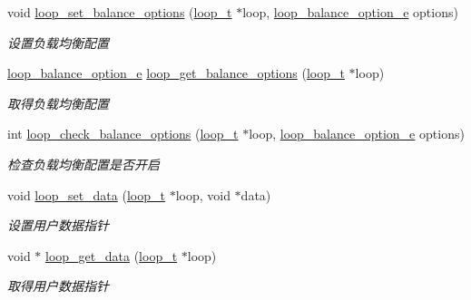 \begin{DoxyCompactItemize}
void \hyperlink{a00062_a20964027b5a498c7f206d6a04568fa11_a20964027b5a498c7f206d6a04568fa11}{loop\+\_\+set\+\_\+balance\+\_\+options} (\hyperlink{a00047_a9c3ad1cd2de83e09f3a7b59fa82c94ee_a9c3ad1cd2de83e09f3a7b59fa82c94ee}{loop\+\_\+t} $\ast$loop, \hyperlink{a00047_a6c87150c8f33855c3427c783480fd8ba_a6c87150c8f33855c3427c783480fd8ba}{loop\+\_\+balance\+\_\+option\+\_\+e} options)
\begin{DoxyCompactList}\small\item\em 设置负载均衡配置 \end{DoxyCompactList}\item 
\hyperlink{a00047_a6c87150c8f33855c3427c783480fd8ba_a6c87150c8f33855c3427c783480fd8ba}{loop\+\_\+balance\+\_\+option\+\_\+e} \hyperlink{a00062_a5098c33527e18f4a0bd9bc1856ce17f1_a5098c33527e18f4a0bd9bc1856ce17f1}{loop\+\_\+get\+\_\+balance\+\_\+options} (\hyperlink{a00047_a9c3ad1cd2de83e09f3a7b59fa82c94ee_a9c3ad1cd2de83e09f3a7b59fa82c94ee}{loop\+\_\+t} $\ast$loop)
\begin{DoxyCompactList}\small\item\em 取得负载均衡配置 \end{DoxyCompactList}\item 
int \hyperlink{a00062_aff034d62b761d4ebad97180fb55a4582_aff034d62b761d4ebad97180fb55a4582}{loop\+\_\+check\+\_\+balance\+\_\+options} (\hyperlink{a00047_a9c3ad1cd2de83e09f3a7b59fa82c94ee_a9c3ad1cd2de83e09f3a7b59fa82c94ee}{loop\+\_\+t} $\ast$loop, \hyperlink{a00047_a6c87150c8f33855c3427c783480fd8ba_a6c87150c8f33855c3427c783480fd8ba}{loop\+\_\+balance\+\_\+option\+\_\+e} options)
\begin{DoxyCompactList}\small\item\em 检查负载均衡配置是否开启 \end{DoxyCompactList}\item 
void \hyperlink{a00094_ga480fadf19a49cb27354866e06500a03c_ga480fadf19a49cb27354866e06500a03c}{loop\+\_\+set\+\_\+data} (\hyperlink{a00047_a9c3ad1cd2de83e09f3a7b59fa82c94ee_a9c3ad1cd2de83e09f3a7b59fa82c94ee}{loop\+\_\+t} $\ast$loop, void $\ast$data)
\begin{DoxyCompactList}\small\item\em 设置用户数据指针 \end{DoxyCompactList}\item 
void $\ast$ \hyperlink{a00062_aaec184f54f4ccb89ab5fa003345cd338_aaec184f54f4ccb89ab5fa003345cd338}{loop\+\_\+get\+\_\+data} (\hyperlink{a00047_a9c3ad1cd2de83e09f3a7b59fa82c94ee_a9c3ad1cd2de83e09f3a7b59fa82c94ee}{loop\+\_\+t} $\ast$loop)
\begin{DoxyCompactList}\small\item\em 取得用户数据指针 \end{DoxyCompactList}\end{DoxyCompactItemize}


